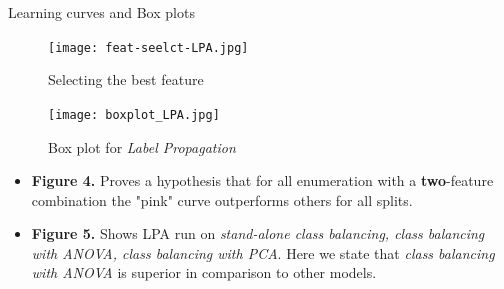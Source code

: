 \documentclass[final]{beamer}
\newlength{\colwidth}
\begin{document}
\begin{frame}[t]
\begin{columns}[t]
\begin{column}{\colwidth}
  \begin{block}{Learning curves and Box plots}

    \begin{figure}[ht]
    \begin{minipage}[b]{.40\textwidth}
    \centering
    \texttt{[image: feat-seelct-LPA.jpg]}
    \caption{Selecting the best feature}
    \label{fig:box-whisker-plot}
    \end{minipage}\qquad
    \begin{minipage}[b]{.40\textwidth}
    \centering
    \texttt{[image: boxplot\_LPA.jpg]}
    \caption{Box plot for \textit{Label Propagation}}
    \label{fig:lineplot-lpa}
    \end{minipage}
    \end{figure} 

    \begin{itemize}
        \item \textbf{Figure 4.} Proves a hypothesis that for all enumeration with a \textbf{two}-feature combination the "pink" curve outperforms others for all splits.
        \item \textbf{Figure 5.} Shows LPA run on \textit{stand-alone class balancing, class balancing with ANOVA, class balancing with PCA}. Here we state that \textit{class balancing with ANOVA} is superior in comparison to other models.  
    \end{itemize} 



\end{block}
\end{column}
\end{columns}
\end{frame}
\end{document}
